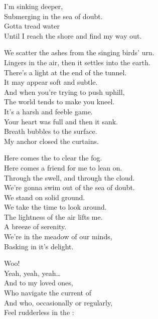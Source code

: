 I'm sinking deeper, \\
Submerging in the sea of doubt. \\
Gotta tread water \\
Until I reach the shore and find my way out. \\


We scatter the ashes from the singing birds' urn. \\
Lingers in the air, then it settles into the earth. \\
There's a light at the end of the tunnel. \\
It may appear soft and subtle. \\
And when you're trying to push uphill, \\
The world tends to make you kneel. \\
It's a harsh and feeble game. \\
Your heart was full and then it sank. \\
Breath bubbles to the surface. \\
My anchor closed the curtains. \\


Here comes the  to clear the fog. \\
Here comes a friend for me to lean on. \\
Through the swell, and through the cloud. \\
We're gonna swim out of the sea of doubt. \\

We stand on solid ground. \\
We take the time to look around. \\
The lightness of the air lifts me. \\
A breeze of serenity. \\
We're in the meadow of our minds, \\
Basking in it's delight. \\





Woo! \\
Yeah, yeah, yeah… \\
And to my loved ones, \\
Who navigate the current of  \\
And who, occasionally or regularly, \\
Feel rudderless in the : \\

